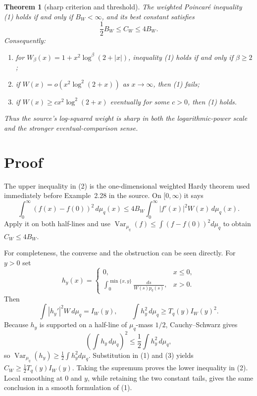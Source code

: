 \documentclass[10pt]{article}
\newtheorem{theorem}{Theorem}
\newcommand{\Var}{\operatorname{Var}}
\begin{document}
\begin{theorem}[sharp criterion and threshold]\label{thm:main}
The weighted Poincar\'e inequality \emph{(1)} holds if and only if
$B_W<\infty$, and its best constant satisfies
\begin{equation}
 \frac12 B_W\le C_W\le4B_W.                                  \tag{2}
\end{equation}
Consequently:
\begin{enumerate}
\item for $W_\beta(x)=1+x^2\log^\beta(2+|x|)$,
      inequality \emph{(1)} holds if and only if $\beta\ge2$;
\item if $W(x)=o(x^2\log^2(2+x))$ as $x\to\infty$, then
      \emph{(1)} fails;
\item if $W(x)\ge c x^2\log^2(2+x)$ eventually for some $c>0$,
      then \emph{(1)} holds.
\end{enumerate}
Thus the source's log-squared weight is sharp in both the logarithmic-power
scale and the stronger eventual-comparison sense.
\end{theorem}

\section{Proof}
The upper inequality in (2) is the one-dimensional weighted Hardy theorem
used immediately before Example~2.28 in the source.  On $[0,\infty)$ it says
\[
 \int_0^\infty (f(x)-f(0))^2\,d\mu_q(x)
 \le4B_W\int_0^\infty |f'(x)|^2W(x)\,d\mu_q(x).
\]
Apply it on both half-lines and use
$\Var_{\mu_q}(f)\le\int(f-f(0))^2d\mu_q$ to obtain $C_W\le4B_W$.

For completeness, the converse and the obstruction can be seen directly.
For $y>0$ set
\[
 h_y(x)=
 \begin{cases}
 0,&x\le0,\\[2pt]
 \displaystyle\int_0^{\min\{x,y\}}\frac{ds}{W(s)p_q(s)},&x>0.
 \end{cases}
\]
Then
\[
 \int |h_y'|^2W\,d\mu_q=I_W(y),\qquad
 \int h_y^2\,d\mu_q\ge T_q(y)I_W(y)^2.                    \tag{3}
\]
Because $h_y$ is supported on a half-line of $\mu_q$-mass $1/2$,
Cauchy--Schwarz gives
\[
 \left(\int h_y\,d\mu_q\right)^2
 \le\frac12\int h_y^2\,d\mu_q,
\]
so $\Var_{\mu_q}(h_y)\ge\frac12\int h_y^2d\mu_q$.
Substitution in (1) and (3) yields
$C_W\ge\frac12T_q(y)I_W(y)$.  Taking the supremum proves the
lower inequality in (2).  Local smoothing at $0$ and $y$, while retaining
the two constant tails, gives the same conclusion in a smooth formulation
of (1).
\end{document}
